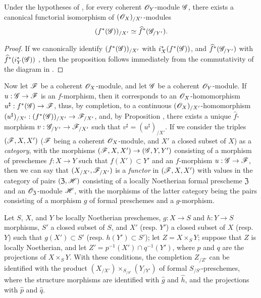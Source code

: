 \begin{proposition}[10.9.5]
\label{I.10.9.5}
Under the hypotheses of , for every coherent $\mathscr{O}_Y$-module $\mathscr{G}$, there exists a canonical functorial isomorphism of $(\mathscr{O}_X)_{/X'}$-modules
\[
  (f^*(\mathscr{G}))_{/X'}\simeq\widehat{f}^*(\mathscr{G}_{/Y'}).
\]
\end{proposition}

\begin{proof}
If we canonically identify $(f^*(\mathscr{G}))_{/X'}$ with $i_X^*(f^*(\mathscr{G}))$, and $\widehat{f}^*(\mathscr{G}_{/Y'})$ with $\widehat{f}^*(i_Y^*(\mathscr{G}))$ , then the proposition follows immediately from the commutativity of the diagram in .
\end{proof}

\begin{env}[10.9.6]
\label{I.10.9.6}
Now let $\mathscr{F}$ be a coherent $\mathscr{O}_X$-module, and let $\mathscr{G}$ be a coherent $\mathscr{O}_Y$-module.
If $u:\sh{G}\to\sh{F}$ is an $f$-morphism, then it corresponds to an $\mathscr{O}_X$-homomorphism $u^\sharp:f^*(\sh{G})\to\sh{F}$, thus, by completion, to a continuous $(\mathscr{O}_X)_{/X'}$-homomorphism $(u^\sharp)_{/X'}:(f^*(\sh{G}))_{/X'}\to\sh{F}_{/X'}$, and, by Proposition , there exists a unique $\widehat{f}$-morphism $v:\sh{G}_{/Y'}\to\sh{F}_{/X'}$
such that $v^\sharp=(u^\sharp)_{/X'}$.
If we consider the triples $(\mathscr{F},X,X')$ ($\mathscr{F}$ being a coherent $\mathscr{O}_X$-module, and $X'$ a closed subset of $X$) as a \emph{category}, with the morphisms $(\sh{F},X,X')\to(\sh{G},Y,Y')$ consisting of a morphism of preschemes $f:X\to Y$ such that $f(X')\subset Y'$ and an $f$-morphism $u:\sh{G}\to\sh{F}$, then we can say that $(X_{/X'},\mathscr{F}_{/X'})$ is a \emph{functor} in $(\mathscr{F},X,X')$ with values in the category of pairs $(\mathfrak{Z},\mathscr{H})$ consisting of a locally Noetherian formal prescheme $\mathfrak{Z}$ and an $\mathscr{O}_\mathfrak{Z}$-module $\mathscr{H}$, with the morphisms of the latter category being the pairs consisting of a morphism $g$ of formal preschemes and a $g$-morphism.
\end{env}

\begin{proposition}[10.9.7]
\label{I.10.9.7}
Let $S$, $X$, and $Y$ be locally Noetherian preschemes, $g:X\to S$ and $h:Y\to S$ morphisms, $S'$ a closed subset of $S$, and $X'$ (resp. $Y'$) a closed subset of $X$ (resp. $Y$) such that $g(X')\subset S'$ (resp. $h(Y')\subset S'$); let $Z=X\times_S Y$; suppose that $Z$ is locally Noetherian, and let $Z'=p^{-1}(X')\cap q^{-1}(Y')$, where $p$ and $q$ are the projections of $X\times_S Y$.
With these conditions, the completion $Z_{/Z'}$ can be identified with the product $(X_{/X'})\times_{S_{/S'}}(Y_{/Y'})$ of formal $S_{/S'}$-preschemes, where the structure morphisms are identified with $\widehat{g}$ and $\widehat{h}$, and the projections with $\widehat{p}$ and $\widehat{q}$.
\end{proposition}

